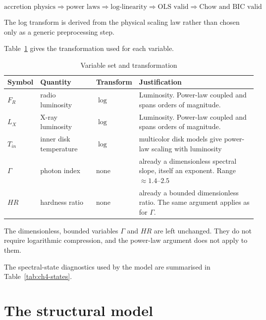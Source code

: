 \begin{equation}
    \label{eq:ch4-3}
\text{accretion physics} \Rightarrow \text{power laws} \Rightarrow \text{log-linearity} \Rightarrow \text{OLS valid} \Rightarrow \text{Chow and BIC valid}
\end{equation}

The log transform is derived from the physical scaling law rather than chosen only as
a generic preprocessing step.

Table~\ref{tab:ch4-variables} gives the transformation used for each variable.



\begin{table}[htbp]
    \centering
    \small
    \caption{Variable set and transformation}
    \label{tab:ch4-variables}
    \begin{tabularx}{\textwidth}{|>{\raggedright\arraybackslash}p{1.3cm}|>{\raggedright\arraybackslash}p{2.6cm}|>{\raggedright\arraybackslash}p{1.9cm}|>{\raggedright\arraybackslash}X|}
        \hline
        Symbol & Quantity & Transform & Justification \\ \hline
        $F_R$ & radio luminosity & $\log$ & Luminosity. Power-law coupled and spans orders of magnitude. \\ \hline
        $L_X$ & X-ray luminosity & $\log$ & Luminosity. Power-law coupled and spans orders of magnitude. \\ \hline
        $T_{in}$ & inner disk temperature & $\log$ & multicolor disk models give power-law scaling with luminosity \\ \hline
        $\Gamma$ & photon index & none & already a dimensionless spectral slope, itself an exponent. Range $\approx 1.4$--$2.5$ \\ \hline
        $HR$ & hardness ratio & none & already a bounded dimensionless ratio. The same argument applies as for $\Gamma$. \\ \hline
\end{tabularx}
\end{table}

The dimensionless, bounded variables $\Gamma$ and $HR$ are left unchanged. They do
not require logarithmic compression, and the power-law argument does not apply to
them.

The spectral-state diagnostics used by the model are summarised in Table~\ref{tab:ch4-states}.


\section{The structural model}


